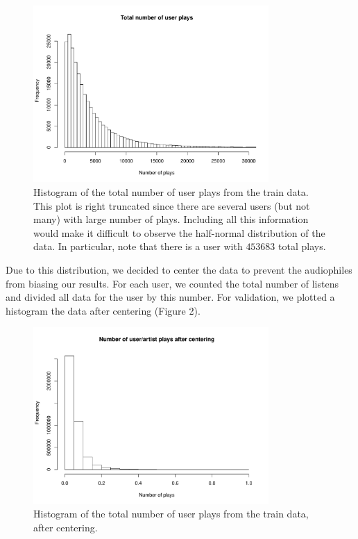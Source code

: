 \documentclass[10pt]{article}
\begin{document}
\begin{figure}[h]
\centering
\includegraphics[width=0.8\textwidth]{../experiments/total_counts.pdf}
\caption{Histogram of the total number of user plays from the train data. This plot is right truncated since there are several users (but not many) with large number of plays. Including all this information would make it difficult to observe the half-normal distribution of the data. In particular, note that there is a user with $453683$ total plays.}
\label{fig:img3}
\end{figure}

Due to this distribution, we decided to center the data to prevent the audiophiles from biasing our results. For each user, we counted the total number of listens and divided all data for the user by this number. For validation, we plotted a histogram the data after centering (Figure 2).

\begin{figure}[h]
\centering
\includegraphics[width=0.8\textwidth]{../experiments/centered_train_hist.pdf}
\caption{Histogram of the total number of user plays from the train data, after centering.}
\label{fig:img3}
\end{figure}
\end{document}
